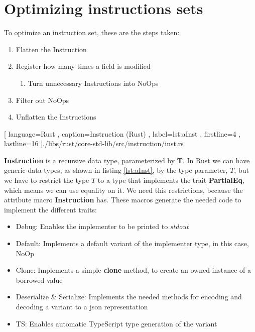 \chapter{Optimizing instructions sets} \label{app:a}

To optimize an instruction set, these are the steps taken:

\begin{enumerate}
  \item Flatten the Instruction
  \item Register how many times a field is modified
    \begin{enumerate}
      \item Turn unnecessary Instructions into NoOps
    \end{enumerate}
  \item Filter out NoOps
  \item Unflatten the Instructions
\end{enumerate}

\begin{center}
  
   [ language=Rust
   , caption={Instruction (Rust)}
   , label=lst:aInst
   , firstline=4
   , lastline=16
   ]{./libs/rust/core-std-lib/src/instruction/inst.rs}
\end{center}

\textbf{Instruction} is a recursive data type, parameterized by \textbf{T}. In
Rust we can have generic data types, as shown in listing \ref{lst:aInst}, by the
type parameter, $T$, but we have to restrict the type $T$ to a type that
implements the trait \textbf{PartialEq}, which means we can use equality on it.
We need this restrictions, because the attribute macro \textbf{Instruction} has.
These macros generate the needed code to implement the different traits:

\begin{itemize}
  \item Debug: Enables the implementer to be printed to \textit{stdout}
  \item Default: Implements a default variant of the implementer type, in this
    case, NoOp
  \item Clone: Implements a simple \textbf{clone} method, to create an owned
    instance of a borrowed value
  \item Deserialize \& Serialize: Implements the needed methods for encoding
    and decoding a variant to a \gls{json} representation
  \item TS: Enables automatic TypeScript type generation of the variant
\end{itemize}

